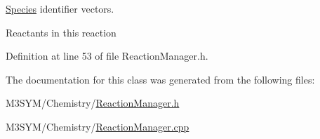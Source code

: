 \hyperlink{classSpecies}{Species} identifier vectors. 

Reactants in this reaction 

Definition at line 53 of file Reaction\+Manager.\+h.



The documentation for this class was generated from the following files\+:\begin{DoxyCompactItemize}
\item 
M3\+S\+Y\+M/\+Chemistry/\hyperlink{ReactionManager_8h}{Reaction\+Manager.\+h}\item 
M3\+S\+Y\+M/\+Chemistry/\hyperlink{ReactionManager_8cpp}{Reaction\+Manager.\+cpp}\end{DoxyCompactItemize}
